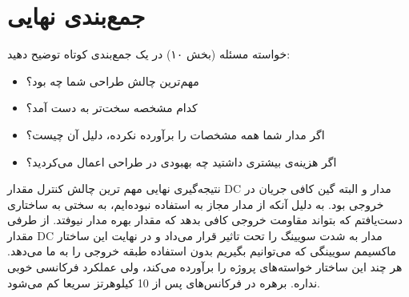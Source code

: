 \documentclass[12pt,a4paper]{article}
\begin{document}
\newpage

\section{جمع‌بندی نهایی}

\begin{taskbox}{خواسته مسئله (بخش ۱۰)}
در یک جمع‌بندی کوتاه توضیح دهید:
\begin{itemize}
    \item مهم‌ترین چالش طراحی شما چه بود؟
    \item کدام مشخصه سخت‌تر به دست آمد؟
    \item اگر مدار شما همه مشخصات را برآورده نکرده، دلیل آن چیست؟
    \item اگر هزینه‌ی بیشتری داشتید چه بهبودی در طراحی اعمال می‌کردید؟
\end{itemize}
\end{taskbox}

\begin{answerbox}{نتیجه‌گیری نهایی}
مهم ترین چالش کنترل مقدار DC مدار و البته گین کافی جریان در خروجی بود. به دلیل آنکه از مدار  مجاز به استفاده نبوده‌ایم، به سختی به ساختاری دست‌یافتم که بتواند مقاومت خروجی کافی بدهد که مقدار بهره مدار نیوفتد. از طرفی مقدار DC مدار به شدت سویینگ را تحت تاثیر قرار می‌داد و در نهایت این ساختار ماکسیمم سویینگی که می‌توانیم بگیریم بدون استفاده طبقه خروجی  را به ما می‌دهد.
هر چند این ساختار خواسته‌های پروژه را برآورده می‌کند، ولی عملکرد فرکانسی خوبی نداره. برهره در فرکانس‌های پس از 10 کیلوهرتز سریعا کم می‌شود. 


\end{answerbox}
\end{document}
